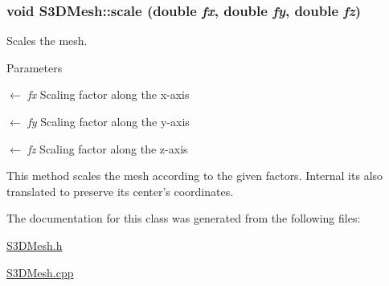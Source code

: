 \hypertarget{class_s3_d_mesh_ad1de35530a123dbb515e37afc8ecc0e3}{
\subsubsection[{scale}]{\setlength{\rightskip}{0pt plus 5cm}void S3DMesh::scale (double {\em fx}, \/  double {\em fy}, \/  double {\em fz})}}
\label{class_s3_d_mesh_ad1de35530a123dbb515e37afc8ecc0e3}


Scales the mesh. 


\begin{DoxyParams}{Parameters}
\item[\mbox{$\leftarrow$} {\em fx}]Scaling factor along the x-\/axis \item[\mbox{$\leftarrow$} {\em fy}]Scaling factor along the y-\/axis \item[\mbox{$\leftarrow$} {\em fz}]Scaling factor along the z-\/axis\end{DoxyParams}
This method scales the mesh according to the given factors. Internal its also translated to preserve its center's coordinates. 

The documentation for this class was generated from the following files:\begin{DoxyCompactItemize}
\item 
\hyperlink{_s3_d_mesh_8h}{S3DMesh.h}\item 
\hyperlink{_s3_d_mesh_8cpp}{S3DMesh.cpp}\end{DoxyCompactItemize}
